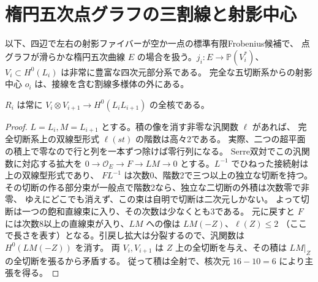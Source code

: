 \section{楕円五次点グラフの三割線と射影中心}
\label{sec:elliptic-quintic-trisecants}
以下、四辺で左右の射影ファイバーが空か一点の標準有限Frobenius候補で、
点グラフが滑らかな楕円五次曲線 $E$ の場合を扱う。$j_i:E\to\mathbb P(V_i^*)$、
$V_i\subset H^0(L_i)$ は非常に豊富な四次元部分系である。
完全な五切断系からの射影中心 $o_i$ は、接線を含む割線多様体の外にある。

\begin{proposition}\label{prop:quintic-mixed-kernel}
$R_i$ は常に $V_i\otimes V_{i+1}\to H^0(L_iL_{i+1})$ の全核である。
\end{proposition}
\begin{proof}
$L=L_i,M=L_{i+1}$ とする。積の像を消す非零な汎関数 $\ell$ があれば、
完全切断系上の双線型形式 $\ell(st)$ の階数は高々2である。
実際、二つの超平面の積上で零なので行と列を一本ずつ除けば零行列になる。
Serre双対でこの汎関数に対応する拡大を
$0\to\mathcal O_E\to F\to LM\to0$ とする。$L^{-1}$ でひねった接続射は上の双線型形式であり、
$F L^{-1}$ は次数0、階数2で三つ以上の独立な切断を持つ。
その切断の作る部分束が一般点で階数2なら、独立な二切断の外積は次数零で非零、
ゆえにどこでも消えず、この束は自明で切断は二次元しかない。
よって切断は一つの飽和直線束に入り、その次数は少なくとも3である。
元に戻すと $F$ には次数8以上の直線束が入り、$LM$ への像は $LM(-Z)$、$\ell(Z)\le2$
（ここで長さを表す）となる。引戻し拡大は分裂するので、汎関数は $H^0(LM(-Z))$ を消す。
両 $V_i,V_{i+1}$ は $Z$ 上の全切断を与え、その積は $LM|_Z$ の全切断を張るから矛盾する。
従って積は全射で、核次元 $16-10=6$ により主張を得る。
\end{proof}

